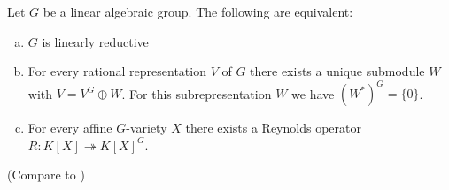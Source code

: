 
\begin{theorem}\label{equiv}
  Let $G$ be a linear algebraic group.
  The following are equivalent:
  \begin{enumerate}[(a)]
  \item $G$ is linearly reductive
  \item For every rational representation $V$ of $G$ there exists a unique submodule $W$ with $V = V^G \oplus W$.
    For this subrepresentation $W$ we have $(W^\ast)^G = \{0\}$.
  \item For every affine $G$-variety $X$ there exists a Reynolds operator \linebreak$R \colon K[X] \twoheadrightarrow K[X]^G $.
  \end{enumerate}
  (Compare to \cite[2.2.5]{DK15})
\end{theorem}

